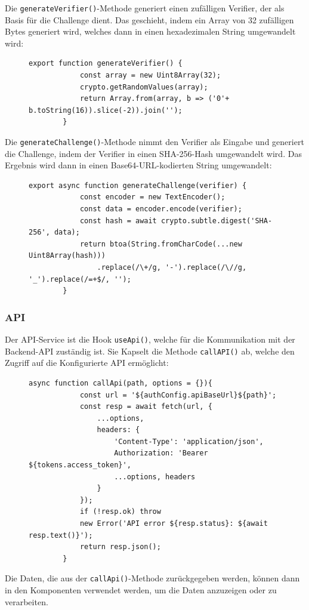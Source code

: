 Die \texttt{generateVerifier()}-Methode generiert einen zufälligen Verifier, der als Basis für die Challenge dient. Das geschieht, indem 
ein Array von 32 zufälligen Bytes generiert wird, welches dann in einen hexadezimalen String umgewandelt wird:
\begin{figure}[H]
    \begin{lstlisting}[caption=PKCE-Verifier-Generierung, label=list:pkceverifier]
        export function generateVerifier() {
            const array = new Uint8Array(32);	
            crypto.getRandomValues(array);
            return Array.from(array, b => ('0'+ b.toString(16)).slice(-2)).join('');
        }
    \end{lstlisting}
\end{figure}
Die \texttt{generateChallenge()}-Methode nimmt den Verifier als Eingabe und generiert die Challenge, indem der Verifier in einen SHA-256-Hash umgewandelt wird.
Das Ergebnis wird dann in einen Base64-URL-kodierten String umgewandelt:
\begin{figure}[H]
    \begin{lstlisting}[caption=PKCE-Challenge-Generierung, label=list:pkcechallenge]
        export async function generateChallenge(verifier) {
            const encoder = new TextEncoder();
            const data = encoder.encode(verifier);
            const hash = await crypto.subtle.digest('SHA-256', data);
            return btoa(String.fromCharCode(...new Uint8Array(hash)))
                .replace(/\+/g, '-').replace(/\//g, '_').replace(/=+$/, '');
        }
    \end{lstlisting}
\end{figure}
\subsubsection{API}
Der API-Service ist die Hook \texttt{useApi()}, welche für die Kommunikation mit der Backend-API zuständig ist. 
Sie Kapselt die Methode \texttt{callAPI()} ab, welche den Zugriff auf die Konfigurierte API ermöglicht:
\begin{figure}[H]
    \begin{lstlisting}[caption=PKCE-Challenge-Generierung, label=list:pkcechallenge]
        async function callApi(path, options = {}){
            const url = '${authConfig.apiBaseUrl}${path}';
            const resp = await fetch(url, {
                ...options,
                headers: {
                    'Content-Type': 'application/json',
                    Authorization: 'Bearer ${tokens.access_token}',
                    ...options, headers
                }
            });
            if (!resp.ok) throw 
            new Error('API error ${resp.status}: ${await resp.text()}');
            return resp.json();
        }
    \end{lstlisting}
\end{figure}
Die Daten, die aus der \texttt{callApi()}-Methode zurückgegeben werden, können dann in den Komponenten verwendet werden, um die Daten anzuzeigen oder zu verarbeiten.
